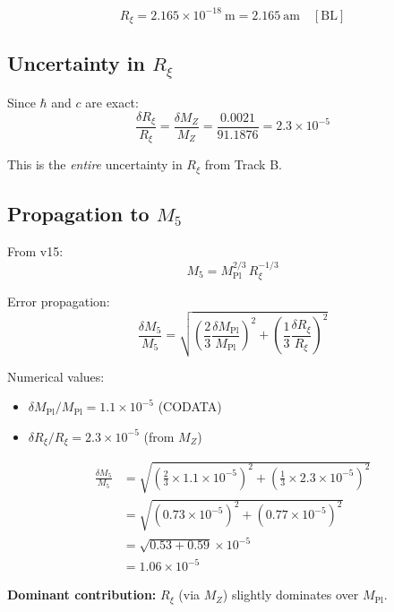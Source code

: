 \documentclass[11pt,a4paper]{article}
\newcommand{\Mpl}{M_{\text{Pl}}}
\newcommand{\Mfive}{M_5}
\newcommand{\MZ}{M_Z}
\newcommand{\Rxi}{R_\xi}
\begin{document}
\begin{equation}
\boxed{
\Rxi = 2.165 \times 10^{-18}~\text{m} = 2.165~\text{am} \quad [\text{BL}]
}
\end{equation}

\subsection{Uncertainty in $\Rxi$}

Since $\hbar$ and $c$ are exact:
\begin{equation}
\frac{\delta\Rxi}{\Rxi} = \frac{\delta\MZ}{\MZ}
= \frac{0.0021}{91.1876} = 2.3 \times 10^{-5}
\end{equation}

This is the \emph{entire} uncertainty in $\Rxi$ from Track B.

\subsection{Propagation to $\Mfive$}

From v15:
\begin{equation}
\Mfive = \Mpl^{2/3} \, \Rxi^{-1/3}
\end{equation}

Error propagation:
\begin{equation}
\label{eq:error-M5}
\frac{\delta\Mfive}{\Mfive} = \sqrt{
\left(\frac{2}{3}\frac{\delta\Mpl}{\Mpl}\right)^2 +
\left(\frac{1}{3}\frac{\delta\Rxi}{\Rxi}\right)^2
}
\end{equation}

Numerical values:
\begin{itemize}
    \item $\delta\Mpl/\Mpl = 1.1 \times 10^{-5}$ (CODATA)
    \item $\delta\Rxi/\Rxi = 2.3 \times 10^{-5}$ (from $\MZ$)
\end{itemize}

\begin{align}
\frac{\delta\Mfive}{\Mfive} &= \sqrt{
\left(\frac{2}{3} \times 1.1 \times 10^{-5}\right)^2 +
\left(\frac{1}{3} \times 2.3 \times 10^{-5}\right)^2
} \nonumber \\
&= \sqrt{(0.73 \times 10^{-5})^2 + (0.77 \times 10^{-5})^2} \nonumber \\
&= \sqrt{0.53 + 0.59} \times 10^{-5} \nonumber \\
&= 1.06 \times 10^{-5}
\end{align}

\textbf{Dominant contribution:} $\Rxi$ (via $\MZ$) slightly dominates over $\Mpl$.
\end{document}
